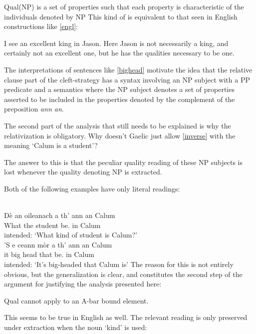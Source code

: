 \documentclass[output=paper]{langsci/langscibook}
\begin{document}
\ea \label{qual} Qual(NP) is a set of properties such that each property is characteristic of the individuals denoted by NP
\z
This kind of  is equivalent to that seen in English constructions
like \eqref{engl}:

\ea \label{engl} I see an excellent king in Jason. \z
Here Jason is not necessarily a king, and certainly not an excellent one, but
he has the qualities necessary to be one.

The interpretations of sentences like \eqref{bighead} motivate the idea that the relative clause part of the cleft-strategy has a syntax involving an NP subject with a PP predicate and a semantics where the NP subject denotes a set of properties asserted to be included in the properties denoted by the complement of the preposition \emph{ann an}.

The second part of the analysis that still needs to be explained is why the relativization is obligatory. Why doesn't Gaelic just allow \eqref{inverse} with the meaning `Calum is a student'?

The answer to this is that the peculiar quality reading of these NP subjects is lost whenever the quality denoting NP is extracted.

Both of the following examples have only literal readings:

\ea {}\\
\gll * D\`e an oileanach a th' {ann an} Calum\\
     {} What the student \Rel{} be.\Prs{} in Calum\\
\glt {} intended: `What kind of student is Calum?'
\ex  {}\\
\gll * 'S e ceann m\`or a th' {ann an} Calum\\
     {} \Cop{} it big head that be.\Prs{} in Calum\\
\glt {} intended: `It's big-headed that Calum is'
\z
The reason for this is not entirely obvious, but the generalization is clear,
and constitutes the second step of the argument for justifying the analysis
presented here:

\ea \label{noqual} Qual cannot apply to an A-bar bound element.\z

This seems to be true in English as well.  The relevant reading is only preserved under extraction when the noun `kind' is used:

\ea
    \z
\z
\end{document}
